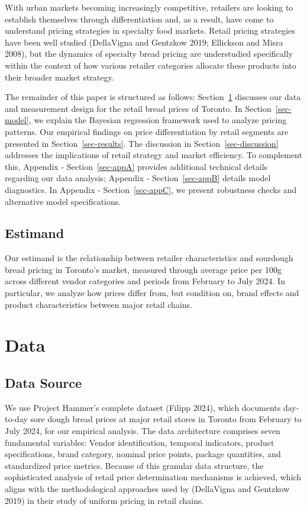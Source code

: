 \documentclass[
  letterpaper,
  DIV=11,
  numbers=noendperiod]{scrartcl}
\begin{document}
With urban markets becoming increasingly competitive, retailers are
looking to establish themselves through differentiation and, as a
result, have come to understand pricing strategies in specialty food
markets. Retail pricing strategies have been well studied (DellaVigna
and Gentzkow 2019; Ellickson and Misra 2008), but the dynamics of
specialty bread pricing are understudied specifically within the context
of how various retailer categories allocate these products into their
broader market strategy.

The remainder of this paper is structured as follows:
Section~\ref{sec-data} discusses our data and measurement design for the
retail bread prices of Toronto. In Section~\ref{sec-model}, we explain
the Bayesian regression framework used to analyze pricing patterns. Our
empirical findings on price differentiation by retail segments are
presented in Section~\ref{sec-results}. The discussion in
Section~\ref{sec-discussion} addresses the implications of retail
strategy and market efficiency. To complement this, Appendix -
Section~\ref{sec-appA} provides additional technical details regarding
our data analysis; Appendix - Section~\ref{sec-appB} details model
diagnostics. In Appendix - Section~\ref{sec-appC}, we present robustness
checks and alternative model specifications.

\subsection{Estimand}\label{estimand}

Our estimand is the relationship between retailer characteristics and
sourdough bread pricing in Toronto's market, measured through average
price per 100g across different vendor categories and periods from
February to July 2024. In particular, we analyze how prices differ from,
but condition on, brand effects and product characteristics between
major retail chains.

\section{Data}\label{sec-data}

\subsection{Data Source}\label{data-source}

We use Project Hammer's complete dataset (Filipp 2024), which documents
day‐to‐day sore dough bread prices at major retail stores in Toronto
from February to July 2024, for our empirical analysis. The data
architecture comprises seven fundamental variables: Vendor
identification, temporal indicators, product specifications, brand
category, nominal price points, package quantities, and standardized
price metrics. Because of this granular data structure, the
sophisticated analysis of retail price determination mechanisms is
achieved, which aligns with the methodological approaches used by
(DellaVigna and Gentzkow 2019) in their study of uniform pricing in
retail chains.
\end{document}
